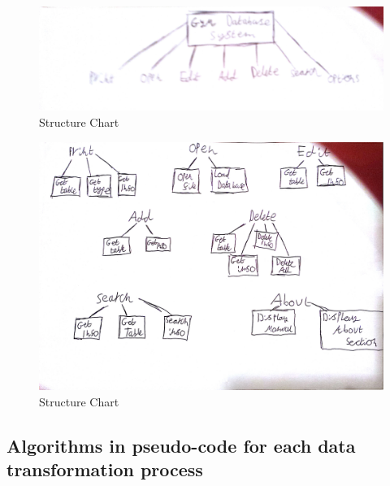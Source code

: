 \begin{figure}[H]
    \includegraphics[width=\textwidth]{StructureChart1.jpg}
    \caption{Structure Chart} \label{fig:StructureChart}
\end{figure}

\begin{figure}[H]
    \includegraphics[width=\textwidth]{StructureChart2.jpg}
    \caption{Structure Chart} \label{fig:StructureChart}
\end{figure}



\subsection{Algorithms in pseudo-code for each data transformation process}

